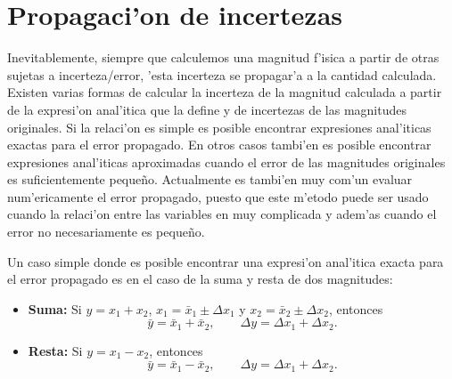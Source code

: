\documentclass[letterpaper,11pt]{report}
\begin{document}
\section{Propagaci'on de incertezas}

Inevitablemente, siempre que calculemos una magnitud f'isica a partir de otras sujetas a incerteza/error, 'esta incerteza se propagar'a a la cantidad calculada. Existen varias formas de calcular la incerteza de la magnitud calculada a partir de la expresi'on anal'itica que la define y de  incertezas de las magnitudes originales. Si la relaci'on es simple es posible encontrar expresiones anal'iticas exactas para el error propagado. En otros casos tambi'en es posible encontrar expresiones anal'iticas aproximadas cuando el error de las magnitudes originales es suficientemente peque\~no. Actualmente es tambi'en muy com'un evaluar num'ericamente el error propagado, puesto que este m'etodo puede ser usado cuando la relaci'on entre las variables en muy complicada y adem'as cuando el error no necesariamente es peque\~no.

Un caso simple donde es posible encontrar una expresi'on anal'itica exacta para el error propagado es en el caso de la suma y resta de dos magnitudes:
\begin{itemize}
\item \textbf{Suma:} Si $y=x_1+x_2$, $x_1 = \bar{x}_1\pm\Delta x_1$ y $x_2 = \bar{x}_2\pm\Delta x_2$, entonces
\begin{equation}
\bar{y}= \bar{x}_1+\bar{x}_2, \qquad  \Delta y= \Delta x_1+\Delta x_2.
\end{equation}
\item \textbf{Resta:} Si $y=x_1-x_2$, entonces
\begin{equation}
\bar{y}= \bar{x}_1-\bar{x}_2, \qquad  \Delta y = \Delta x_1+\Delta x_2.
\end{equation}
\end{itemize}
\end{document}
